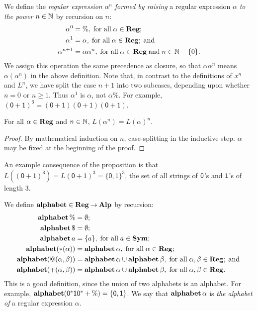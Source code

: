 We define the \emph{regular expression} $\alpha^n$ \emph{formed by
raising} a regular expression $\alpha$ \emph{to the power} $n\in\mathbb{N}$ by
recursion on $n$:
%
%
\begin{align*}
\alpha^0       &= \%, \;\allowbreak\mbox{for all}\allowbreak\;\alpha\in\mathbf{Reg}; \\
\alpha^1       &= \alpha, \;\allowbreak\mbox{for all}\allowbreak\;\alpha\in\mathbf{Reg}; \;\allowbreak\mbox{and}\allowbreak\; \\
\alpha^{n + 1} &= \alpha\alpha^n,\;\allowbreak\mbox{for all}\allowbreak\;\alpha\in\mathbf{Reg}\;\allowbreak\mbox{and}\allowbreak\;
n\in\mathbb{N}-\{0\} .
\end{align*}
We assign this operation the same precedence as closure, so that
$\alpha\alpha^n$ means $\alpha(\alpha^n)$ in the above definition.
Note that, in contrast to the definitions of $x^n$ and $L^n$,
we have split the case $n+1$ into two subcases, depending upon
whether $n=0$ or $n\geq 1$. Thus
$\alpha^1$ is $\alpha$, not $\alpha\%$.
For example, $\mathsf{(0+1)^3}=\mathsf{(0+1)(0+1)(0+1)}$.

\begin{proposition}
\label{RegExponProp}
For all $\alpha\in\mathbf{Reg}$ and $n\in\mathbb{N}$, $L(\alpha^n)=L(\alpha)^n$.
\end{proposition}

\begin{proof}
By mathematical induction on $n$, case-splitting in the inductive
step. $\alpha$ may be fixed at the beginning of the proof.
\end{proof}

An example consequence of the proposition is that
$L(\mathsf{(0+1)^3})=L(\mathsf{0+1})^3=\{\mathsf{0,1}\}^3$, the
set of all strings of $\mathsf{0}$'s and $\mathsf{1}$'s of length $3$.

We define $\mathbf{alphabet}\in\mathbf{Reg}\mathbin{\to}\mathbf{Alp}$ by recursion:
%
%
\begin{align*}
\mathbf{alphabet}\,\% &= \emptyset; \\
\mathbf{alphabet}\,\$ &= \emptyset; \\
\mathbf{alphabet}\,a &= \{a\}, \;\allowbreak\mbox{for all}\allowbreak\;a\in\mathbf{Sym}; \\
\mathbf{alphabet}({*}(\alpha)) &= \mathbf{alphabet}\,\alpha, \;\allowbreak\mbox{for all}\allowbreak\;\alpha\in\mathbf{Reg};\\
\mathbf{alphabet}(@(\alpha,\beta)) &= \mathbf{alphabet}\,\alpha\cup\mathbf{alphabet}\,\beta ,
\;\allowbreak\mbox{for all}\allowbreak\;\alpha,\beta\in\mathbf{Reg}; \;\allowbreak\mbox{and}\allowbreak\; \\
\mathbf{alphabet}({+}(\alpha,\beta)) &= \mathbf{alphabet}\,\alpha\cup\mathbf{alphabet}\,\beta,
\;\allowbreak\mbox{for all}\allowbreak\;\alpha,\beta\in\mathbf{Reg} .
\end{align*}
This is a good definition, since the union of two alphabets is
an alphabet. For example,
$\mathbf{alphabet}(\mathsf{0^*10^*+\%}) = \mathsf{\{0,1\}}$.
We say that $\mathbf{alphabet}\,\alpha$ is \emph{the alphabet of} a regular
expression $\alpha$.

